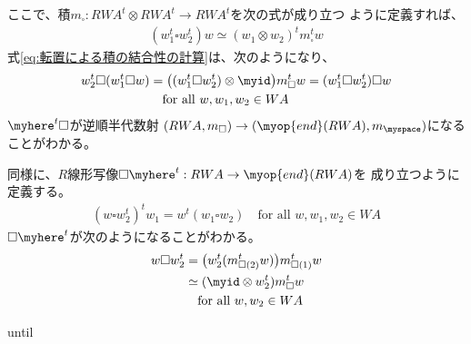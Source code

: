 		ここで、積$m_\square:RWA^t\otimes RWA^t\to RWA^t$を次の式が成り立つ
		ように定義すれば、
		\begin{equation*}\begin{split} %
			(w_1^t\square w_2^t)w \simeq (w_1\otimes w_2)^tm_{\square}^tw 
		\end{split}\end{equation*} %
		式\eqref{eq:転置による積の結合性の計算}は、次のようになり、
		\begin{equation*}\begin{split} %
			w_2^t\square(w_1^t\square w)
			&= \bigl((w_1^t\square w_2^t)\otimes\myid\bigr)m_{\square}^tw
			= (w_1^t\square w_2^t)\square w \\
			&\quad\text{for all }w,w_1,w_2\in WA
		\end{split}\end{equation*} %
		$\myhere^t\square$が逆順半代数射
		$(RWA,m_\square)\to(\myop{end}(RWA),m_\myspace)$になることがわかる。

		同様に、$R$線形写像$\square\myhere^t:RWA\to \myop{end}(RWA)$を
		成り立つように定義する。
		\begin{equation*}\begin{split} %
			(w\square w_2^t)^tw_1 = w^t(w_1\square w_2)
			\quad\text{for all }w,w_1,w_2\in WA
		\end{split}\end{equation*} %
		$\square\myhere^t$が次のようになることがわかる。
		\begin{equation*}\begin{split} %
			w\square w_2^t
			&= \bigl(w_2^t(m_{\square(2)}^tw)\bigr)m_{\square(1)}^tw \\
			&\simeq (\myid\otimes w_2^t)m_{\square}^tw \\
			&\quad\text{for all }w,w_2\in WA
		\end{split}\end{equation*} %

	until

